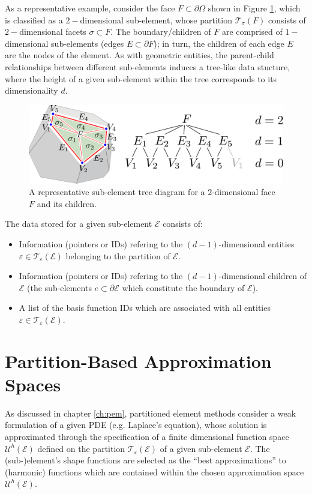	As a representative example, consider the face $F \subset \partial \Omega$ shown in Figure \ref{fig:sub_element}, which is classified as a $2-$dimensional sub-element, whose partition $\mathcal{T}_\sigma (F)$ consists of $2-$dimensional facets $\sigma \subset F$. The boundary/children of $F$ are comprised of $1-$dimensional sub-elements (edges $E \subset \partial F$); in turn, the children of each edge $E$ are the nodes of the element. As with geometric entities, the parent-child relationships between different sub-elements induces a tree-like data stucture, where the height of a given sub-element within the tree corresponds to its dimensionality $d$.
	\begin{figure} [!ht]
		\centering
		\includegraphics[width = 6.0in]{figures/sub_element.pdf}
		\caption{A representative sub-element tree diagram for a $2$-dimensional face $F$ and its children.}
		\label{fig:sub_element}
	\end{figure}
	
	The data stored for a given sub-element $\mathcal{E}$ consists of:
	\begin{itemize}
		\item Information (pointers or IDs) refering to the $(d-1)$-dimensional entities $\varepsilon \in \mathcal{T}_\varepsilon (\mathcal{E})$ belonging to the partition of $\mathcal{E}$.
		\item Information (pointers or IDs) refering to the $(d-1)$-dimensional children of $\mathcal{E}$ (the sub-elements $e \subset \partial \mathcal{E}$ which constitute the boundary of $\mathcal{E}$).
		\item A list of the basis function IDs which are associated with all entities $\varepsilon \in \mathcal{T}_\varepsilon (\mathcal{E})$.
	\end{itemize}
	
\section{Partition-Based Approximation Spaces}

		As discussed in chapter \ref{ch:pem}, partitioned element methods consider a weak formulation of a given PDE (e.g. Laplace's equation), whose solution is approximated through the specification of a finite dimensional function space $\mathcal{U}^h (\mathcal{E})$ defined on the partition $\mathcal{T}_{\varepsilon} (\mathcal{E})$ of a given sub-element $\mathcal{E}$. The (sub-)element's shape functions are selected as the ``best approximations'' to (harmonic) functions which are contained within the chosen approximation space $\mathcal{U}^h (\mathcal{E})$.
		
